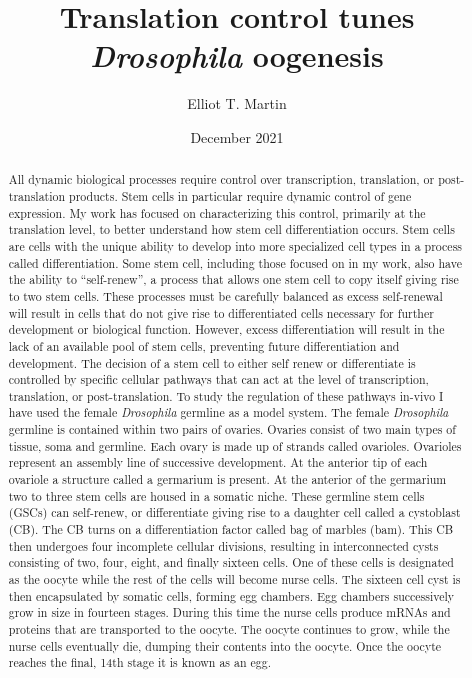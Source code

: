 \documentclass[12pt,oneside]{reedthesis}
\title{Translation control tunes \emph{Drosophila} oogenesis}
\author{Elliot T. Martin}
\date{December 2021}
\begin{document}
  \maketitle

\frontmatter %
\pagestyle{plain} %
  \begin{abstract}
  \setcounter{page}{2}
  \pagestyle{plain}
    All dynamic biological processes require control over transcription, translation, or post-translation products. Stem cells in particular require dynamic control of gene expression. My work has focused on characterizing this control, primarily at the translation level, to better understand how stem cell differentiation occurs. Stem cells are cells with the unique ability to develop into more specialized cell types in a process called differentiation. Some stem cell, including those focused on in my work, also have the ability to ``self-renew'', a process that allows one stem cell to copy itself giving rise to two stem cells. These processes must be carefully balanced as excess self-renewal will result in cells that do not give rise to differentiated cells necessary for further development or biological function. However, excess differentiation will result in the lack of an available pool of stem cells, preventing future differentiation and development.
    The decision of a stem cell to either self renew or differentiate is controlled by specific cellular pathways that can act at the level of transcription, translation, or post-translation. To study the regulation of these pathways in-vivo I have used the female \emph{Drosophila} germline as a model system. The female \emph{Drosophila} germline is contained within two pairs of ovaries. Ovaries consist of two main types of tissue, soma and germline. Each ovary is made up of strands called ovarioles. Ovarioles represent an assembly line of successive development. At the anterior tip of each ovariole a structure called a germarium is present. At the anterior of the germarium two to three stem cells are housed in a somatic niche. These germline stem cells (GSCs) can self-renew, or differentiate giving rise to a daughter cell called a cystoblast (CB). The CB turns on a differentiation factor called bag of marbles (bam). This CB then undergoes four incomplete cellular divisions, resulting in interconnected cysts consisting of two, four, eight, and finally sixteen cells. One of these cells is designated as the oocyte while the rest of the cells will become nurse cells. The sixteen cell cyst is then encapsulated by somatic cells, forming egg chambers. Egg chambers successively grow in size in fourteen stages. During this time the nurse cells produce mRNAs and proteins that are transported to the oocyte. The oocyte continues to grow, while the nurse cells eventually die, dumping their contents into the oocyte. Once the oocyte reaches the final, 14th stage it is known as an egg.

\end{abstract}
\end{document}
